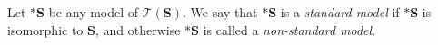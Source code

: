 Let $*\mathbf{S}$ be any model of $\mathcal{T}(\mathbf{S})$. We say that $*\mathbf{S}$ is a \emph{standard model} if $*\mathbf{S}$ is isomorphic to $\mathbf{S}$, and otherwise $*\mathbf{S}$ is called a \emph{non-standard model}.
